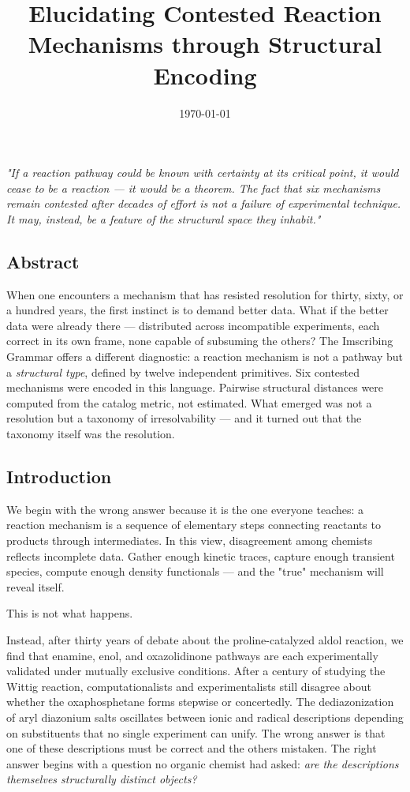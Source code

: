 \documentclass[12pt,a4paper]{article}
\begin{document}
\title{Elucidating Contested Reaction Mechanisms through Structural Encoding}
\date{\today}

\maketitle

\emph{"If a reaction pathway could be known with certainty at its critical point, it would cease to be a reaction --- it would be a theorem. The fact that six mechanisms remain contested after decades of effort is not a failure of experimental technique. It may, instead, be a feature of the structural space they inhabit."}

\subsection{Abstract}

When one encounters a mechanism that has resisted resolution for thirty, sixty, or a hundred years, the first instinct is to demand better data. What if the better data were already there --- distributed across incompatible experiments, each correct in its own frame, none capable of subsuming the others? The Imscribing Grammar offers a different diagnostic: a reaction mechanism is not a pathway but a \emph{structural type}, defined by twelve independent primitives. Six contested mechanisms were encoded in this language. Pairwise structural distances were computed from the catalog metric, not estimated. What emerged was not a resolution but a taxonomy of irresolvability --- and it turned out that the taxonomy itself was the resolution.

\subsection{Introduction}

We begin with the wrong answer because it is the one everyone teaches: a reaction mechanism is a sequence of elementary steps connecting reactants to products through intermediates. In this view, disagreement among chemists reflects incomplete data. Gather enough kinetic traces, capture enough transient species, compute enough density functionals --- and the "true" mechanism will reveal itself.

This is not what happens.

Instead, after thirty years of debate about the proline-catalyzed aldol reaction, we find that enamine, enol, and oxazolidinone pathways are each experimentally validated under mutually exclusive conditions. After a century of studying the Wittig reaction, computationalists and experimentalists still disagree about whether the oxaphosphetane forms stepwise or concertedly. The dediazonization of aryl diazonium salts oscillates between ionic and radical descriptions depending on substituents that no single experiment can unify. The wrong answer is that one of these descriptions must be correct and the others mistaken. The right answer begins with a question no organic chemist had asked: \emph{are the descriptions themselves structurally distinct objects?}
\end{document}
